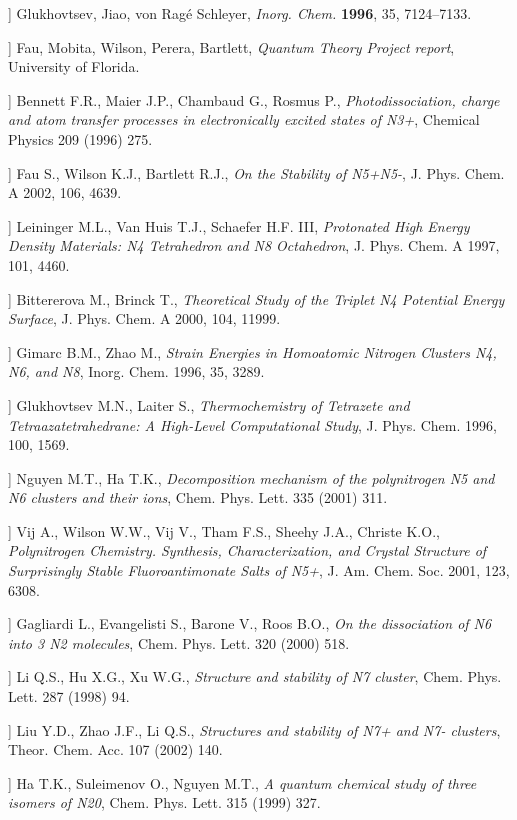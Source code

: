 \begin{description}[leftmargin=1.6cm,itemsep=3pt,style=nextline]
\item[[GS]] Glukhovtsev, Jiao, von Rag\'e Schleyer, \emph{Inorg. Chem.} \textbf{1996}, 35, 7124--7133.
\item[[B]] Fau, Mobita, Wilson, Perera, Bartlett, \emph{Quantum Theory Project report}, University of Florida.
\item[[A1]] Bennett F.R., Maier J.P., Chambaud G., Rosmus P., \emph{Photodissociation, charge and atom transfer processes in electronically excited states of N3+}, Chemical Physics 209 (1996) 275.
\item[[A2]] Fau S., Wilson K.J., Bartlett R.J., \emph{On the Stability of N5+N5-}, J. Phys. Chem. A 2002, 106, 4639.
\item[[A3]] Leininger M.L., Van Huis T.J., Schaefer H.F. III, \emph{Protonated High Energy Density Materials: N4 Tetrahedron and N8 Octahedron}, J. Phys. Chem. A 1997, 101, 4460.
\item[[A4]] Bittererova M., Brinck T., \emph{Theoretical Study of the Triplet N4 Potential Energy Surface}, J. Phys. Chem. A 2000, 104, 11999.
\item[[A5]] Gimarc B.M., Zhao M., \emph{Strain Energies in Homoatomic Nitrogen Clusters N4, N6, and N8}, Inorg. Chem. 1996, 35, 3289.
\item[[A6]] Glukhovtsev M.N., Laiter S., \emph{Thermochemistry of Tetrazete and Tetraazatetrahedrane: A High-Level Computational Study}, J. Phys. Chem. 1996, 100, 1569.
\item[[A7]] Nguyen M.T., Ha T.K., \emph{Decomposition mechanism of the polynitrogen N5 and N6 clusters and their ions}, Chem. Phys. Lett. 335 (2001) 311.
\item[[A8]] Vij A., Wilson W.W., Vij V., Tham F.S., Sheehy J.A., Christe K.O., \emph{Polynitrogen Chemistry. Synthesis, Characterization, and Crystal Structure of Surprisingly Stable Fluoroantimonate Salts of N5+}, J. Am. Chem. Soc. 2001, 123, 6308.
\item[[A9]] Gagliardi L., Evangelisti S., Barone V., Roos B.O., \emph{On the dissociation of N6 into 3 N2 molecules}, Chem. Phys. Lett. 320 (2000) 518.
\item[[A10]] Li Q.S., Hu X.G., Xu W.G., \emph{Structure and stability of N7 cluster}, Chem. Phys. Lett. 287 (1998) 94.
\item[[A11]] Liu Y.D., Zhao J.F., Li Q.S., \emph{Structures and stability of N7+ and N7- clusters}, Theor. Chem. Acc. 107 (2002) 140.
\item[[A12]] Ha T.K., Suleimenov O., Nguyen M.T., \emph{A quantum chemical study of three isomers of N20}, Chem. Phys. Lett. 315 (1999) 327.

\end{description}

